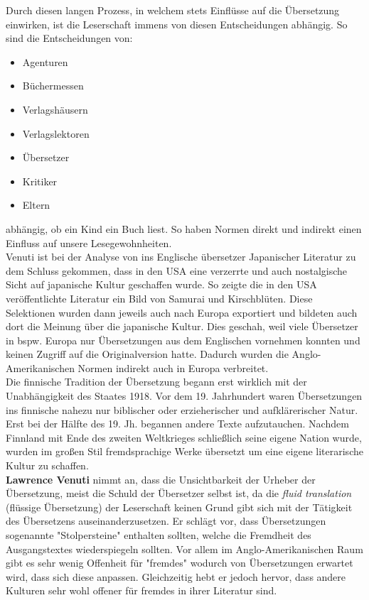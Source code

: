 \documentclass{article}
\begin{document}
	Durch diesen langen Prozess, in welchem stets Einflüsse auf die Übersetzung einwirken, ist die Leserschaft immens von diesen Entscheidungen abhängig. So sind die Entscheidungen von:
	\begin{itemize}
		\item{Agenturen}
		\item{Büchermessen}
		\item{Verlagshäusern}
		\item{Verlagslektoren}
		\item{Übersetzer}
		\item{Kritiker}
		\item{Eltern}
	\end{itemize}
	abhängig, ob ein Kind ein Buch liest. So haben Normen direkt und indirekt einen Einfluss auf unsere Lesegewohnheiten. \\
	Venuti ist bei der Analyse von ins Englische übersetzer Japanischer Literatur zu dem Schluss gekommen, dass in den USA eine verzerrte und auch nostalgische Sicht auf japanische Kultur geschaffen wurde. So zeigte die in den USA veröffentlichte Literatur ein Bild von Samurai und Kirschblüten. Diese Selektionen wurden dann jeweils auch nach Europa exportiert und bildeten auch dort die Meinung über die japanische Kultur. Dies geschah, weil viele Übersetzer in bspw. Europa nur Übersetzungen aus dem Englischen vornehmen konnten und keinen Zugriff auf die Originalversion hatte. Dadurch wurden die Anglo-Amerikanischen Normen indirekt auch in Europa verbreitet.\\
	Die finnische Tradition der Übersetzung begann erst wirklich mit der Unabhängigkeit des Staates 1918. Vor dem 19. Jahrhundert waren Übersetzungen ins finnische nahezu nur biblischer oder erzieherischer und aufklärerischer Natur. Erst bei der Hälfte des 19. Jh. begannen andere Texte aufzutauchen. Nachdem Finnland mit Ende des zweiten Weltkrieges schließlich seine eigene Nation wurde, wurden im großen Stil fremdsprachige Werke übersetzt um eine eigene literarische Kultur zu schaffen. \\
	\textbf{Lawrence Venuti} nimmt an, dass die Unsichtbarkeit der Urheber der Übersetzung, meist die Schuld der Übersetzer selbst ist, da die \textit{fluid translation} (flüssige Übersetzung) der Leserschaft keinen Grund gibt sich mit der Tätigkeit des Übersetzens auseinanderzusetzen. Er schlägt vor, dass Übersetzungen sogenannte "Stolpersteine" enthalten sollten, welche die Fremdheit des Ausgangstextes wiederspiegeln sollten. Vor allem im Anglo-Amerikanischen Raum gibt es sehr wenig Offenheit für "fremdes" wodurch von Übersetzungen erwartet wird, dass sich diese anpassen. Gleichzeitig hebt er jedoch hervor, dass andere Kulturen sehr wohl offener für fremdes in ihrer Literatur sind. \\
\end{document}
